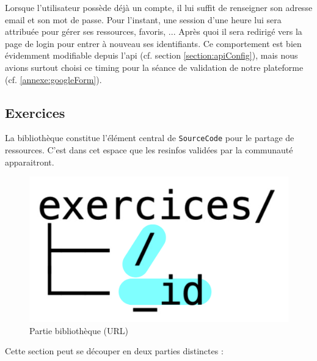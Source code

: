 Lorsque l'utilisateur possède déjà un compte, il lui suffit de renseigner son adresse email et son mot de passe. Pour l'instant, une session d'une heure lui sera attribuée pour gérer ses ressources, favoris, ... Après quoi il sera redirigé vers la page de login pour entrer à nouveau ses identifiants. Ce comportement est bien évidemment modifiable depuis l'api (cf. section \ref{section:apiConfig}), mais nous avions surtout choisi ce timing pour la séance de validation de notre plateforme (cf. \ref{annexe:googleForm}).\\

\vspace{20mm} %

\subsection{Exercices}

La bibliothèque constitue l'élément central de \texttt{SourceCode} pour le partage de ressources. C'est dans cet espace que les \glspl{resinfo} validées par la communauté apparaitront.\\

\begin{figure}[H]
    \includegraphics[width=\textwidth,height=0.08\textheight,keepaspectratio]{images/client/exercices.jpeg}
    \centering
    \caption[SourceCode : partie bibliothèque]{Partie bibliothèque (URL)}
\end{figure}

Cette section peut se découper en deux parties distinctes :


